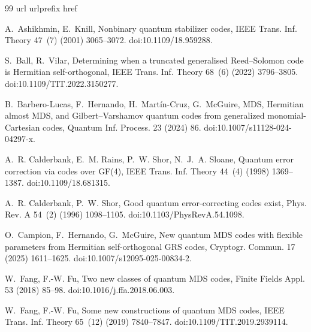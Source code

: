 \documentclass[preprint,12pt,a4paper]{elsarticle}
\begin{document}
\begin{thebibliography}{99}
\expandafter\ifx\csname url\endcsname\relax
  \def\url#1{\texttt{#1}}\fi
\expandafter\ifx\csname urlprefix\endcsname\relax\def\urlprefix{URL }\fi
\expandafter\ifx\csname href\endcsname\relax
  \def\href#1#2{#2} \def\path#1{#1}\fi

A.~Ashikhmin, E.~Knill, Nonbinary quantum stabilizer codes, IEEE Trans. Inf. Theory 47~(7) (2001) 3065--3072.
\newblock \href {https://doi.org/10.1109/18.959288}
  {\path{doi:10.1109/18.959288}}.

S.~Ball, R.~Vilar, Determining when a truncated generalised {Reed--Solomon}
  code is {Hermitian} self-orthogonal, IEEE Trans. Inf. Theory
  68~(6) (2022) 3796--3805.
\newblock \href {https://doi.org/10.1109/TIT.2022.3150277}
  {\path{doi:10.1109/TIT.2022.3150277}}.

B.~Barbero-Lucas, F.~Hernando, H.~Mart{\'i}n-Cruz, G.~McGuire, {MDS},
  {Hermitian} almost {MDS}, and {Gilbert--Varshamov} quantum codes from
  generalized monomial-Cartesian codes, Quantum Inf. Process. 23
  (2024) 86.
\newblock \href {https://doi.org/10.1007/s11128-024-04297-x}
  {\path{doi:10.1007/s11128-024-04297-x}}.

A.~R. Calderbank, E.~M. Rains, P.~W. Shor, N.~J.~A. Sloane, Quantum error
  correction via codes over {GF}(4), IEEE Trans. Inf. Theory
  44~(4) (1998) 1369--1387.
\newblock \href {https://doi.org/10.1109/18.681315}
  {\path{doi:10.1109/18.681315}}.

A.~R. Calderbank, P.~W. Shor, Good quantum error-correcting codes exist,
  Phys. Rev. A 54~(2) (1996) 1098--1105.
\newblock \href {https://doi.org/10.1103/PhysRevA.54.1098}
  {\path{doi:10.1103/PhysRevA.54.1098}}.

O.~Campion, F.~Hernando, G.~McGuire, New quantum {MDS} codes with flexible
  parameters from {Hermitian} self-orthogonal {GRS} codes, Cryptogr. Commun. 17 (2025) 1611--1625.
\newblock \href {https://doi.org/10.1007/s12095-025-00834-2}
  {\path{doi:10.1007/s12095-025-00834-2}}.

W.~Fang, F.-W. Fu, Two new classes of quantum {MDS} codes, Finite Fields Appl. 53 (2018) 85--98.
\newblock \href {https://doi.org/10.1016/j.ffa.2018.06.003}
  {\path{doi:10.1016/j.ffa.2018.06.003}}.

W.~Fang, F.-W. Fu, Some new constructions of quantum {MDS} codes, IEEE Trans. Inf. Theory 65~(12) (2019) 7840--7847.
\newblock \href {https://doi.org/10.1109/TIT.2019.2939114}
  {\path{doi:10.1109/TIT.2019.2939114}}.


\end{thebibliography}
\end{document}
